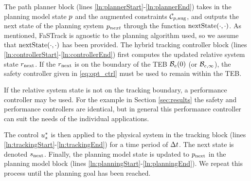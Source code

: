 The path planner block (lines \ref{ln:plannerStart}-\ref{ln:plannerEnd}) takes in the planning model state $p$ and the augmented constraints $\mathcal C_{p,\text{aug}}$, and outputs the next state of the planning system $p_{next}$ through the function $\text{nextState}(\cdot, \cdot)$.
As mentioned, FaSTrack is agnostic to the planning algorithm used, so we assume that $\text{nextState}(\cdot, \cdot)$ has been provided.
The hybrid tracking controller block (lines \ref{ln:controllerStart}-\ref{ln:controllerEnd}) first computes the updated relative system state $r_\text{next}$. 
If the $r_\text{next}$ is on the boundary of the TEB $\mathcal B_e(0)$ (or $\mathcal B_{e, \infty}$), the safety controller given in \eqref{eq:opt_ctrl} must be used to remain within the TEB. 

If the relative system state is not on the tracking boundary, a performance controller may be used. For the example in Section \ref{sec:results} the safety and performance controllers are identical, but in general this performance controller can suit the needs of the individual applications.

The control $u_s^*$ is then applied to the physical system in the tracking block (lines \ref{ln:trackingStart}-\ref{ln:trackingEnd}) for a time period of $\Delta t$. 
The next state is denoted $s_\text{next}$. 
Finally, the planning model state is updated to $p_\text{next}$ in the planning model block (lines \ref{ln:planningStart}-\ref{ln:planningEnd}). 
We repeat this process until the planning goal has been reached.